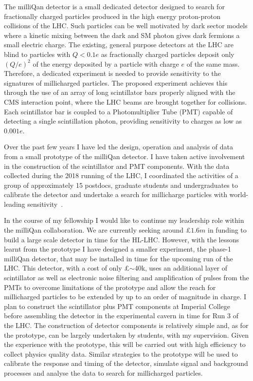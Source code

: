 \documentclass[11pt,twocolumn]{article}
\theoremstyle{plain} \numberwithin{equation}{section}
\theoremstyle{definition}
\begin{document}
The milliQan detector is a small dedicated detector 
designed to search for fractionally 
charged particles produced in the high energy proton-proton collisions of the LHC. 
Such particles can be well motivated by dark sector models where a kinetic mixing between
the dark and SM photon gives dark fermions a small electric charge.
The existing, general purpose detectors at the LHC are blind to particles with
$Q< 0.1 e$ as fractionally charged particles deposit only $(Q/e)^2$ of the energy 
deposited by a particle with charge $e$ of
the same mass. Therefore, a dedicated experiment is needed to 
provide sensitivity to the signatures of 
millicharged particles. The proposed experiment achieves 
this through the use of an array of long scintillator
bars properly aligned with the CMS interaction point, where the LHC beams are
brought together for collisions. Each scintillator bar is coupled to a
Photomultiplier Tube (PMT) capable of detecting a single scintillation photon, providing sensitivity to
charges as low as $0.001 e$. 

Over the past few years I have led the design, operation and analysis
of data from a small prototype of the milliQan detector. I have taken active involvement
in the construction of the scintillator and PMT components. With the data
collected during the 2018 running of the LHC, I coordinated the activities
of a group of approximately 15 postdocs, graduate students 
and undergraduates to calibrate the detector and undertake a
search for millicharge particles with world-leading sensitivity~\cite{ball2020search}. 

In the course of my fellowship I would like to continue my leadership role 
within the milliQan collaboration. We are currently seeking around £$1.6m$ in 
funding to build a large scale detector in time for the HL-LHC. 
However, with the lessons learnt from the 
prototype I have designed a smaller experiment, the phase-1 milliQan detector, 
that may be installed in time for the upcoming run of the LHC. 
This detector, with a cost of only £$\sim$40k, uses an additional layer of scintillator 
as well as electronic noise
filtering and amplification of pulses from the PMTs to overcome limitations of the prototype
and allow the reach for millicharged particles to be extended by 
up to an order of magnitude in charge. I plan
to construct the scintillator plus PMT
components at Imperial College before assembling the detector in the experimental cavern
in time for Run 3 of the LHC.
The construction of detector components is relatively simple and, 
as for the prototype, can be largely undertaken
by students, with my supervision. Given the experience with the
prototype, this will be carried out with high efficiency to collect physics quality
data. Similar strategies to the prototype will be used to calibrate the response and timing of the 
detector, simulate signal and background processes and analyse the data to 
search for millicharged particles.
 
\end{document}
